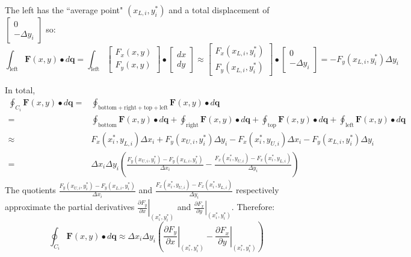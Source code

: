 \documentclass{article}
\begin{document}
The left has the ``average point" \((x_{L,i}, y_i^*)\) and a total displacement of \(\begin{bmatrix} 0 \\ -\Delta y_i \end{bmatrix}\) so: 
\[\int_{\text{left}} \mathbf{F}(x,y) \bullet d\mathbf{q} = \int_{\text{left}} \begin{bmatrix} F_x(x,y) \\ F_y(x,y) \end{bmatrix} \bullet \begin{bmatrix} dx \\ dy \end{bmatrix} \approx \begin{bmatrix} F_x(x_{L,i}, y_i^*) \\ F_y(x_{L,i}, y_i^*) \end{bmatrix} \bullet \begin{bmatrix} 0 \\ -\Delta y_i \end{bmatrix} = -F_y(x_{L,i}, y_i^*) \Delta y_i\]

In total, 
\begin{align*}
\oint_{C_i} \mathbf{F}(x,y) \bullet d\mathbf{q} = & 
\oint_{\text{bottom} + \text{right} + \text{top} + \text{left}} \mathbf{F}(x,y) \bullet d\mathbf{q} \\ 
= & \oint_{\text{bottom}} \mathbf{F}(x,y) \bullet d\mathbf{q} + \oint_{\text{right}} \mathbf{F}(x,y) \bullet d\mathbf{q} + \oint_{\text{top}} \mathbf{F}(x,y) \bullet d\mathbf{q} + \oint_{\text{left}} \mathbf{F}(x,y) \bullet d\mathbf{q} \\ 
\approx & F_x(x_i^*, y_{L,i}) \Delta x_i + F_y(x_{U,i}, y_i^*) \Delta y_i - F_x(x_i^*, y_{U,i}) \Delta x_i - F_y(x_{L,i}, y_i^*) \Delta y_i \\   
= & \Delta x_i \Delta y_i \left(\frac{F_y(x_{U,i}, y_i^*) - F_y(x_{L,i}, y_i^*)}{\Delta x_i} - \frac{F_x(x_i^*, y_{U,i}) - F_x(x_i^*, y_{L,i})}{\Delta y_i}\right) 
\end{align*}
The quotients \(\frac{F_y(x_{U,i}, y_i^*) - F_y(x_{L,i}, y_i^*)}{\Delta x_i}\) and \(\frac{F_x(x_i^*, y_{U,i}) - F_x(x_i^*, y_{L,i})}{\Delta y_i}\) respectively approximate the partial derivatives \(\left.\frac{\partial F_y}{\partial x}\right|_{(x_i^*, y_i^*)}\) and \(\left.\frac{\partial F_x}{\partial y}\right|_{(x_i^*, y_i^*)}\). Therefore:
\[\oint_{C_i} \mathbf{F}(x,y) \bullet d\mathbf{q} \approx \Delta x_i \Delta y_i \left(\left.\frac{\partial F_y}{\partial x}\right|_{(x_i^*, y_i^*)} - \left.\frac{\partial F_x}{\partial y}\right|_{(x_i^*, y_i^*)}\right)\]
\end{document}
